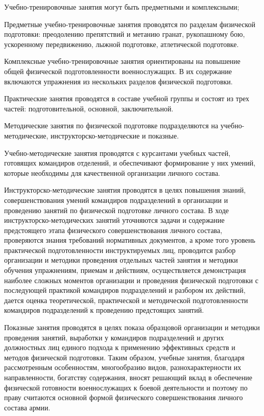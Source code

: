 \documentclass[a4paper]{article}
\begin{document}
    Учебно-тренировочные занятия могут быть предметными и комплексными;

    Предметные учебно-тренировочные занятия проводятся по разделам физической подготовки: преодолению препятствий и метанию гранат, рукопашному бою, ускоренному передвижению, лыжной подготовке, атлетической подготовке.

    Комплексные учебно-тренировочные занятия ориентированы на повышение общей физической подготовленности военнослужащих. В их содержание включаются упражнения из нескольких разделов физической подготовки.

    Практические занятия проводятся в составе учебной группы и состоят из трех частей: подготовительной, основной, заключительной.

    Методические занятия по физической подготовке подразделяются на учебно-методические, инструкторско-методические и показные.

    Учебно-методические занятия проводятся с курсантами учебных частей, готовящих командиров отделений, и обеспечивают формирование у них умений, которые необходимы для качественной организации личного состава.

    Инструкторско-методические занятия проводятся в целях повышения знаний, совершенствования умений командиров подразделений в организации и проведению занятий по физической подготовке личного состава. В ходе инструкторско-методических занятий уточняются задачи и содержание предстоящего этапа физического совершенствования личного состава, проверяются знания требований нормативных документов, а кроме того уровень практической подготовленности инструктируемых лиц, проводится разбор организации и методики проведения отдельных частей занятия и методики обучения упражнениям, приемам и действиям, осуществляется демонстрация наиболее сложных моментов организации и проведения физической подготовки с последующей практикой командиров подразделений и разбором их действий, дается оценка теоретической, практической и методической подготовленности командиров подразделений к проведению предстоящих занятий.

    Показные занятия проводятся в целях показа образцовой организации и методики проведения занятий, выработки у командиров подразделений и других должностных лиц единого подхода к применению эффективных средств и методов физической подготовки. Таким образом, учебные занятия, благодаря рассмотренным особенностям, многообразию видов, разнохарактерности их направленности, богатству содержания, вносят решающий вклад в обеспечение физической готовности военнослужащих к боевой деятельности и поэтому по праву считаются основной формой физического совершенствования личного состава армии.
\end{document}
